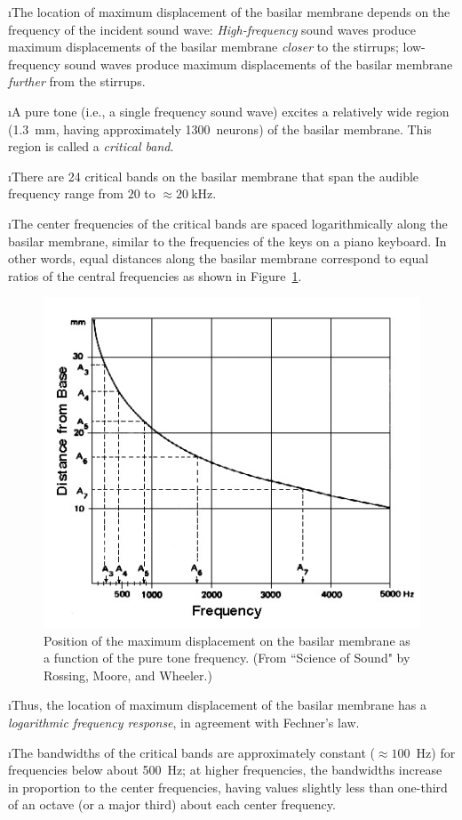\i The location of maximum displacement of the basilar 
membrane depends on the frequency of the incident sound wave:
{\em High-frequency} sound waves produce maximum displacements 
of the basilar membrane {\em closer} to the stirrups;
{low-frequency} sound waves produce maximum displacements 
of the basilar membrane {\em further} from the stirrups.

\i A pure tone (i.e., a single frequency sound wave)
excites a relatively wide region (1.3~mm, having 
approximately 1300~neurons) of the basilar membrane.
This region is called a {\em critical band}.

\i There are 24 critical bands on the basilar membrane
that span the audible frequency range from $20$ to $\approx 20~$kHz.

\i The center frequencies of the critical bands are spaced 
logarithmically along the basilar membrane, similar to 
the frequencies of the keys on a piano keyboard.
In other words, equal distances along the basilar membrane 
correspond to equal ratios of the central frequencies as shown
in Figure~\ref{f:basilar-resonance-max}.
%
\begin{figure}[htbp]
\begin{center}
\includegraphics[width=.6\textwidth]{basilar-resonance-max.jpg}
\caption{Position of the maximum displacement on 
the basilar membrane as a function of the pure tone 
frequency.
(From ``Science of Sound" by Rossing, Moore, and Wheeler.)}
\label{f:basilar-resonance-max}
\end{center}
\end{figure}
%

\i Thus, the location of maximum displacement of the 
basilar membrane has a {\em logarithmic frequency response},
in agreement with Fechner's law.

\i The bandwidths of the critical bands are approximately
constant ($\approx 100$~Hz) for frequencies below about 500~Hz;
at higher frequencies, the bandwidths increase in proportion 
to the center frequencies, having values slightly less than 
one-third of an octave (or a major third) about each center
frequency.

